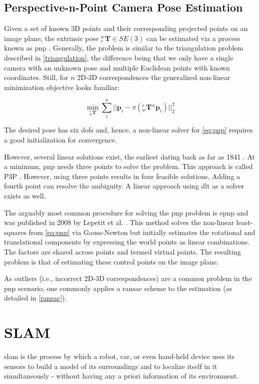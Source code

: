 \documentclass[headsepline, hidelinks, footsepline, footinclude=false, oneside, fontsize=11pt, paper=a4, listof=totoc, bibliography=totoc]{scrbook}
\begin{document}
\subsection{Perspective-n-Point Camera Pose Estimation \label{pnp}}
\label{sec:org28140c1}
    Given a set of known 3D points and their corresponding projected points on an image plane, the extrinsic pose \({}^w_c\mathbf{T} \in SE(3)\) can be estimated via a process known as \gls{pnp} \cite{longquanLinearNpointCamera1999}.
Generally, the problem is similar to the triangulation problem described in \cref{triangulation}, the difference being that we only have a single camera with an unknown pose and multiple Euclidean points with known coordinates.
Still, for \(n\) 2D-3D correspondences the generalized non-linear minimization objective looks familiar:

\begin{equation}
\label{eq:pnp}
\min_{{}^c_w\mathbf{T}} \sum_i^n||\mathbf{p}_i - \pi({}^c_w\mathbf{T}{}^w\mathbf{p}_i)||_2^2
\end{equation}

The desired pose has six \glspl{dof} and, hence, a non-linear solver for \cref{eq:pnp} requires a good initialization for convergence.

However, several linear solutions exist, the earliest dating back as far as 1841 \cite{longquanLinearNpointCamera1999}. 
At a minimum, \gls{pnp} needs three points to solve the problem. This approach is called P3P \cite{xiao-shangaoCompleteSolutionClassification2003}. 
However, using three points results in four feasible solutions. Adding a fourth point can resolve the ambiguity.
A linear approach using \gls{dlt} as a solver exists as well.

The arguably most common procedure for solving the \gls{pnp} problem is \gls{epnp} and was published in 2008 by Lepetit et al. \cite{lepetitEPnPAccurateSolution2009}.
This method solves the non-linear least-squares from \cref{eq:pnp} via Gauss-Newton but initially estimates the rotational and translational components by expressing the world points as linear combinations. The factors are shared across points and termed virtual points. The resulting problem is that of estimating these control points on the image plane.

As outliers (i.e., incorrect 2D-3D correspondences) are a common problem in the \gls{pnp} scenario, one commonly applies a \gls{ransac} scheme to the estimation (as detailed in \cref{ransac}).

\section{SLAM \label{slam}}
\label{sec:org0e0d7d6}
   \gls{slam} is the process by which a robot, car, or even hand-held device uses its sensors to build a model of its surroundings and to localize itself in it simultaneously - 
without having any a priori information of its environment. 
\end{document}
